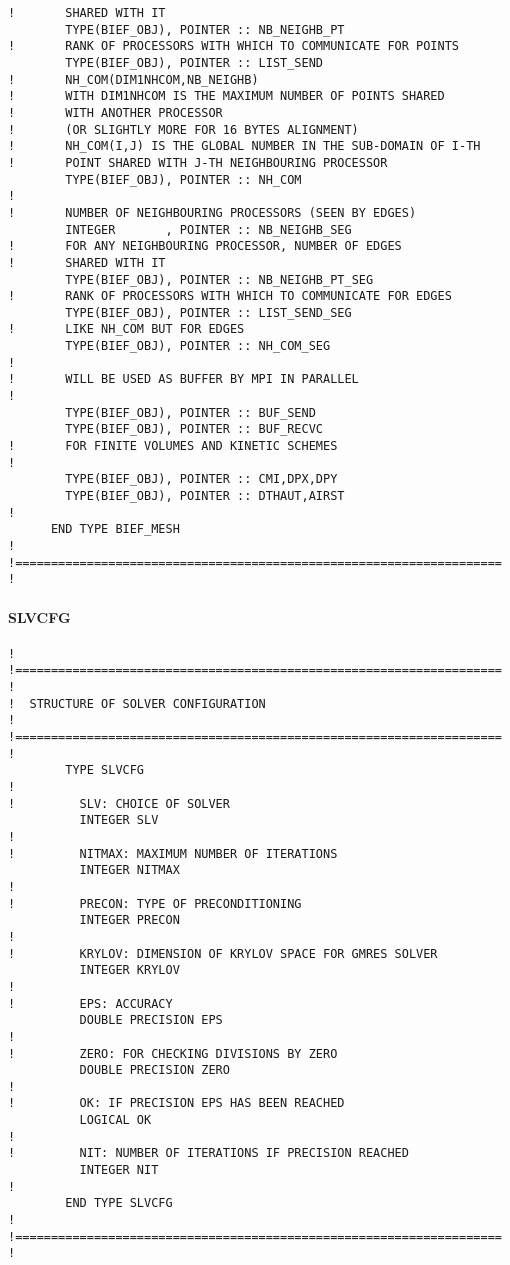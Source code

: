 \begin{lstlisting}[language=TelFortran]
!       SHARED WITH IT
        TYPE(BIEF_OBJ), POINTER :: NB_NEIGHB_PT
!       RANK OF PROCESSORS WITH WHICH TO COMMUNICATE FOR POINTS
        TYPE(BIEF_OBJ), POINTER :: LIST_SEND
!       NH_COM(DIM1NHCOM,NB_NEIGHB)
!       WITH DIM1NHCOM IS THE MAXIMUM NUMBER OF POINTS SHARED
!       WITH ANOTHER PROCESSOR
!       (OR SLIGHTLY MORE FOR 16 BYTES ALIGNMENT)
!       NH_COM(I,J) IS THE GLOBAL NUMBER IN THE SUB-DOMAIN OF I-TH
!       POINT SHARED WITH J-TH NEIGHBOURING PROCESSOR
        TYPE(BIEF_OBJ), POINTER :: NH_COM
!
!       NUMBER OF NEIGHBOURING PROCESSORS (SEEN BY EDGES)
        INTEGER       , POINTER :: NB_NEIGHB_SEG
!       FOR ANY NEIGHBOURING PROCESSOR, NUMBER OF EDGES
!       SHARED WITH IT
        TYPE(BIEF_OBJ), POINTER :: NB_NEIGHB_PT_SEG
!       RANK OF PROCESSORS WITH WHICH TO COMMUNICATE FOR EDGES
        TYPE(BIEF_OBJ), POINTER :: LIST_SEND_SEG
!       LIKE NH_COM BUT FOR EDGES
        TYPE(BIEF_OBJ), POINTER :: NH_COM_SEG
!
!       WILL BE USED AS BUFFER BY MPI IN PARALLEL
!
        TYPE(BIEF_OBJ), POINTER :: BUF_SEND
        TYPE(BIEF_OBJ), POINTER :: BUF_RECVC
!       FOR FINITE VOLUMES AND KINETIC SCHEMES
!
        TYPE(BIEF_OBJ), POINTER :: CMI,DPX,DPY
        TYPE(BIEF_OBJ), POINTER :: DTHAUT,AIRST
!
      END TYPE BIEF_MESH
!
!====================================================================
!
\end{lstlisting}

\paragraph{SLVCFG}

\begin{lstlisting}[language=TelFortran]
!
!====================================================================
!
!  STRUCTURE OF SOLVER CONFIGURATION
!
!====================================================================
!
        TYPE SLVCFG
!
!         SLV: CHOICE OF SOLVER
          INTEGER SLV
!
!         NITMAX: MAXIMUM NUMBER OF ITERATIONS
          INTEGER NITMAX
!
!         PRECON: TYPE OF PRECONDITIONING
          INTEGER PRECON
!
!         KRYLOV: DIMENSION OF KRYLOV SPACE FOR GMRES SOLVER
          INTEGER KRYLOV
!
!         EPS: ACCURACY
          DOUBLE PRECISION EPS
!
!         ZERO: FOR CHECKING DIVISIONS BY ZERO
          DOUBLE PRECISION ZERO
!
!         OK: IF PRECISION EPS HAS BEEN REACHED
          LOGICAL OK
!
!         NIT: NUMBER OF ITERATIONS IF PRECISION REACHED
          INTEGER NIT
!
        END TYPE SLVCFG
!
!====================================================================
!
\end{lstlisting}


